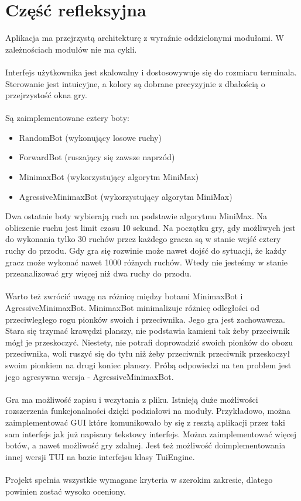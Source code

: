 \documentclass[12pt, titlepage]{article}
\begin{document}
\pagebreak
\section{Część refleksyjna}
Aplikacja ma przejrzystą architekturę z wyraźnie
oddzielonymi modułami. W zależnościach modułów nie
ma cykli. 
\\~\\
Interfejs użytkownika jest skalowalny i dostosowywuje się
do rozmiaru terminala. Sterowanie jest intuicyjne, a kolory
są dobrane precyzyjnie z dbałością o przejrzystość okna gry.
\\~\\
Są zaimplementowane cztery boty:
\begin{itemize}
	\item{RandomBot (wykonujący losowe ruchy)}
	\item{ForwardBot (ruszający się zawsze naprzód)}
	\item{MinimaxBot (wykorzystujący algorytm MiniMax)}
	\item{AgressiveMinimaxBot (wykorzystujący algorytm MiniMax)}
\end{itemize}

\noindent
Dwa ostatnie boty wybierają ruch na podstawie algorytmu MiniMax.
Na obliczenie ruchu jest limit czasu 10 sekund. Na początku gry,
gdy możliwych jest do wykonania tylko 30 ruchów przez każdego gracza
są w stanie wejść cztery ruchy do przodu. Gdy gra się rozwinie może
nawet dojść do sytuacji, że każdy gracz może wykonać nawet 1000
różnych
ruchów. Wtedy nie jesteśmy w stanie przeanalizować gry więcej niż
dwa ruchy do przodu.
\\~\\
Warto też zwrócić uwagę
na różnicę między botami MinimaxBot i AgressiveMinimaxBot.
MinimaxBot minimalizuje różnicę odległości od przeciwległego rogu
pionków swoich i przeciwnika. Jego gra jest zachowawcza. Stara się
trzymać krawędzi planszy, nie podstawia kamieni tak żeby
przeciwnik mógł
je przeskoczyć. Niestety, nie potrafi doprowadzić swoich pionków do
obozu przeciwnika, woli ruszyć się do tyłu niż żeby przeciwnik
przeciwnik przeskoczył swoim pionkiem na drugi koniec planszy.
Próbą odpowiedzi na ten problem jest jego agresywna wersja -
AgressiveMinimaxBot.
\\~\\
Gra ma możliwość zapisu i wczytania z pliku. Istnieją duże możliwości
rozszerzenia
funkcjonalności dzięki podziałowi na moduły. Przykładowo, można
zaimplementować GUI które komunikowało by
się z resztą aplikacji przez taki sam interfejs jak już
napisany tekstowy interfejs. Można
zaimplementować więcej botów, a nawet możliwość gry zdalnej.
Jest też możliwość doimplementowania innej wersji TUI na
bazie interfejsu klasy TuiEngine.
\\~\\
Projekt spełnia wszystkie wymagane kryteria w szerokim zakresie,
dlatego powinien zostać wysoko oceniony.
\end{document}
